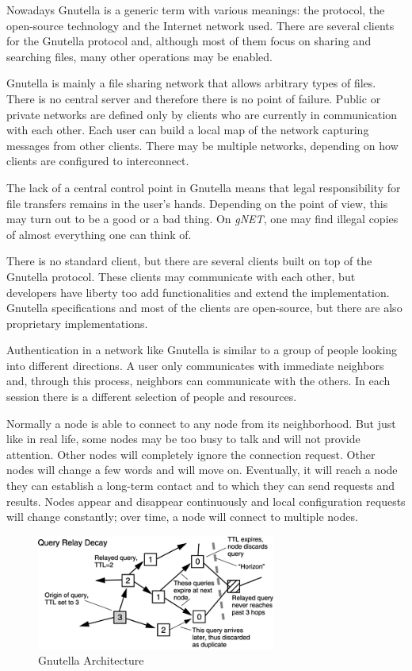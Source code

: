 Nowadays Gnutella is a generic term with various meanings: the protocol, the
open-source technology and the Internet network used. There are several
clients for the Gnutella protocol and, although most of them focus on sharing
and searching files, many other operations may be enabled.

Gnutella is mainly a file sharing network that allows arbitrary types of
files. There is no central server and therefore there is no point of failure.
Public or private networks are defined only by clients who are currently in
communication with each other. Each user can build a local map of the network
capturing messages from other clients. There may be multiple networks,
depending on how clients are configured to interconnect.

The lack of a central control point in Gnutella means that legal
responsibility for file transfers remains in the user's hands. Depending on
the point of view, this may turn out to be a good or a bad thing. On
\textit{gNET}, one may find illegal copies of almost everything one can think
of.

There is no standard client, but there are several clients built on top of the
Gnutella protocol. These clients may communicate with each other, but
developers have liberty too add functionalities and extend the implementation.
Gnutella specifications and most of the clients are open-source, but there are
also proprietary implementations.

Authentication in a network like Gnutella is similar to a group of people
looking into different directions. A user only communicates with immediate
neighbors and, through this process, neighbors can communicate with the others.
In each session there is a different selection of people and resources.

Normally a node is able to connect to any node from its neighborhood. But just
like in real life, some nodes may be too busy to talk and will not provide
attention. Other nodes will completely ignore the connection request. Other
nodes will change a few words and will move on. Eventually, it will reach a
node they can establish a long-term contact and to which they can send
requests and results. Nodes appear and disappear continuously and local
configuration requests will change constantly; over time, a node will connect
to multiple nodes.

\begin{figure}
  \centering
  \includegraphics[width=0.7\textwidth]{src/img/p2p-systems/gnutella}
  \caption{Gnutella Architecture}
  \label{fig:p2p-systems:gnutella}
\end{figure}

